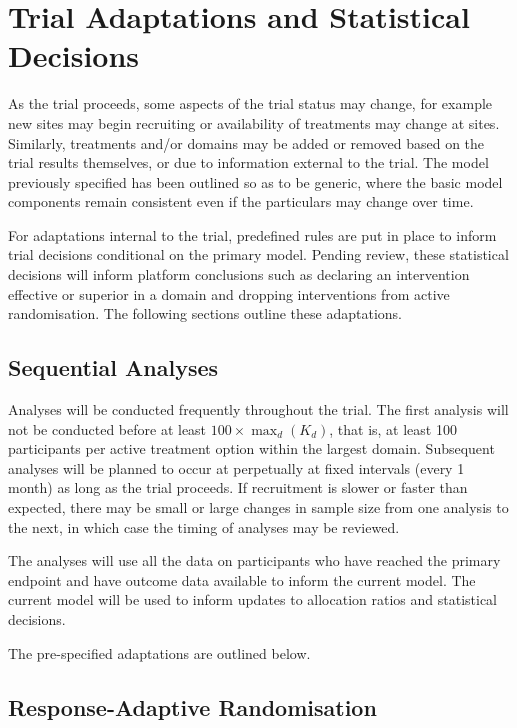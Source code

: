 \documentclass[
  11pt,
]{article}
\begin{document}
\hypertarget{trial-adaptations-and-statistical-decisions}{%
\section{Trial Adaptations and Statistical Decisions}\label{trial-adaptations-and-statistical-decisions}}

As the trial proceeds, some aspects of the trial status may change, for example new sites may begin recruiting or availability of treatments may change at sites.
Similarly, treatments and/or domains may be added or removed based on the trial results themselves, or due to information external to the trial. The model previously specified has been outlined so as to be generic, where the basic model components remain consistent even if the particulars may change over time.

For adaptations internal to the trial, predefined rules are put in place to inform trial decisions conditional on the primary model.
Pending review, these statistical decisions will inform platform conclusions such as declaring an intervention effective or superior in a domain and dropping interventions from active randomisation. The following sections outline these adaptations.

\hypertarget{sequential-analyses}{%
\subsection{Sequential Analyses}\label{sequential-analyses}}

Analyses will be conducted frequently throughout the trial.
The first analysis will not be conducted before at least \(100\times\max_d(K_d)\), that is, at least 100 participants per active treatment option within the largest domain.
Subsequent analyses will be planned to occur at perpetually at fixed intervals (every 1 month) as long as the trial proceeds.
If recruitment is slower or faster than expected, there may be small or large changes in sample size from one analysis to the next, in which case the timing of analyses may be reviewed.

The analyses will use all the data on participants who have reached the primary endpoint and have outcome data available to inform the current model.
The current model will be used to inform updates to allocation ratios and statistical decisions.

The pre-specified adaptations are outlined below.

\hypertarget{response-adaptive-randomisation}{%
\subsection{Response-Adaptive Randomisation}\label{response-adaptive-randomisation}}
\end{document}
